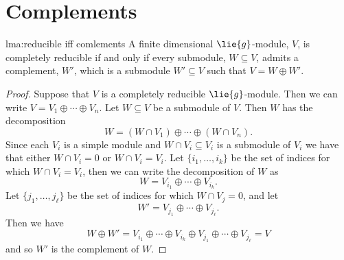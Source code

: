\documentclass[fleqn]{NotesClass}
\begin{document}
    \section{Complements}
    \begin{lma}{}{lma:reducible iff comlements}
        A finite dimensional \(\lie{g}\)-module, \(V\), is completely reducible if and only if every submodule, \(W \subseteq V\), admits a complement, \(W'\), which is a submodule \(W' \subseteq V\) such that \(V = W \oplus W'\).
        \begin{proof}
            Suppose that \(V\) is a completely reducible \(\lie{g}\)-module.
            Then we can write \(V = V_1 \oplus \dotsb \oplus V_n\).
            Let \(W \subseteq V\) be a submodule of \(V\).
            Then \(W\) has the decomposition
            \begin{equation}
                W = (W \cap V_1) \oplus \dotsb \oplus (W \cap V_n).
            \end{equation}
            Since each \(V_i\) is a simple module and \(W \cap V_i \subseteq V_i\) is a submodule of \(V_i\) we have that either \(W \cap V_i = 0\) or \(W \cap V_i = V_i\).
            Let \(\{i_1, \dotsc, i_k\}\) be the set of indices for which \(W \cap V_i = V_i\), then we can write the decomposition of \(W\) as
            \begin{equation}
                W = V_{i_1} \oplus \dotsb \oplus V_{i_k}.
            \end{equation}
            Let \(\{j_1, \dotsc, j_\ell\}\) be the set of indices for which \(W \cap V_j = 0\), and let
            \begin{equation}
                W' = V_{j_1} \oplus \dotsb \oplus V_{j_\ell}.
            \end{equation}
            Then we have
            \begin{equation}
                W \oplus W' = V_{i_1} \oplus \dotsb \oplus V_{i_k} \oplus V_{j_1} \oplus \dotsb \oplus V_{j_\ell} = V
            \end{equation}
            and so \(W'\) is the complement of \(W\).
            

\end{proof}
\end{lma}
\end{document}
